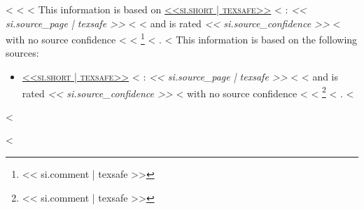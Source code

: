  <%
  <%
  <%
    This information is based on
    \textsc{\hyperlink{source<<si.source_id>>}{<<si.short | texsafe>>}}
    <%
    : \emph{<< si.source_page | texsafe >>}
    <%
    <%
    and is rated
    \emph{<< si.source_confidence >>}
    <%
    with no source confidence
    <%
    <%
    \footnote{<< si.comment | texsafe >>}
    <%
    .
  <%
    This information is based on the following sources:

    \begin{itemize}
    <%
    \item
    \textsc{\hyperlink{source<<si.source_id>>}{<<si.short | texsafe>>}}
    <%
    : \emph{<< si.source_page | texsafe >>}
    <%
    <%
    and is rated
    \emph{<< si.source_confidence >>}
    <%
    with no source confidence
    <%
    <%
    \footnote{<< si.comment | texsafe >>}
    <%
    .
    <%
    \end{itemize}
  <%

<%
